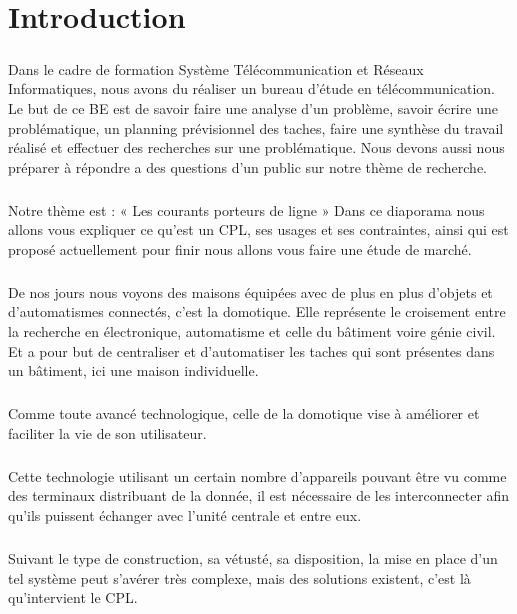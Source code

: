 
\chapter*{Introduction}
    \paragraph{}
Dans le cadre de formation Système Télécommunication et Réseaux Informatiques, nous avons du réaliser un bureau d'étude en télécommunication.
Le but de ce BE est de savoir faire une analyse d'un problème, savoir écrire une problématique, un planning prévisionnel des taches, faire une synthèse du travail réalisé et effectuer des recherches sur une problématique.
Nous devons aussi nous préparer à répondre a des questions d'un public sur notre thème de recherche.
    \paragraph{}
Notre thème est : « Les courants porteurs de ligne »
Dans ce diaporama nous allons vous expliquer ce qu'est un CPL, ses usages et ses contraintes, ainsi qui est proposé actuellement  pour finir nous allons vous faire une étude de marché.
    \paragraph{}
De nos jours nous voyons des maisons équipées avec de plus en plus d'objets et d'automatismes connectés, c'est la domotique.
Elle représente le croisement entre la recherche en électronique, automatisme et celle du bâtiment voire génie civil.
Et a pour but de centraliser et d'automatiser les taches qui sont présentes dans un bâtiment, ici une maison individuelle.
    \paragraph{}
Comme toute avancé technologique, celle de la domotique vise à améliorer et faciliter la vie de son utilisateur.
    \paragraph{}
Cette technologie utilisant un certain nombre d'appareils pouvant être vu comme des terminaux distribuant de la donnée, il est nécessaire de les interconnecter afin qu'ils puissent échanger avec l'unité centrale et entre eux.
    \paragraph{}
Suivant le type de construction, sa vétusté, sa disposition, la mise en place d'un tel système peut s'avérer très complexe, mais des solutions existent, c'est là qu'intervient le CPL.
